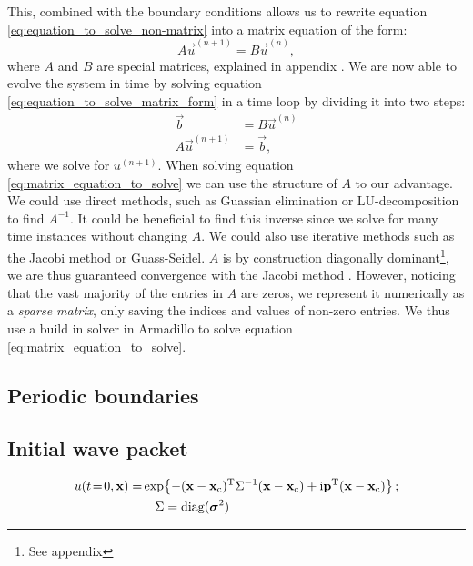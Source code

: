         This, combined with the boundary conditions allows us to rewrite equation \eqref{eq:equation_to_solve_non-matrix} into a matrix equation of the form:
        \begin{equation}\label{eq:equation_to_solve_matrix_form}
            A\vec{u}^{(n+1)} = B\vec{u}^{(n)},
        \end{equation}
        where $A$ and $B$ are special matrices, explained in appendix . 
        We are now able to evolve the system in time by solving equation \eqref{eq:equation_to_solve_matrix_form} in a time loop by dividing it into two steps:
        \begin{equation}\label{eq:matrix_equation_to_solve}
            \begin{split}
                \vec{b} &= B\vec{u}^{(n)} \\
                A\vec{u}^{(n+1)} &= \vec{b},
            \end{split}
        \end{equation}
        where we solve for $u^{(n+1)}$. When solving equation \eqref{eq:matrix_equation_to_solve} we can use the structure of $A$ to our advantage. We could use direct methods, such as Guassian elimination or LU-decomposition to find $A^{-1}$. It could be beneficial to find this inverse since we solve for many time instances without changing $A$. We could also use iterative methods such as the Jacobi method or Guass-Seidel. $A$ is by construction diagonally dominant\footnote{See appendix }, we are thus guaranteed convergence with the Jacobi method . However, noticing that the vast majority of the entries in $A$ are zeros, we represent it numerically as a \textit{sparse matrix}, only saving the indices and values of non-zero entries. We thus use a build in solver in Armadillo to solve equation \eqref{eq:matrix_equation_to_solve}.

\subsection{Periodic boundaries}\label{sec:method:periodic_boundaries}

\subsection{Initial wave packet}\label{sec:method:initial_wave}


    \begin{equation}\label{eq:p4_initial_condition}
    \begin{split}
        u(t\!=\!0, \mathbf{x}) = & \exp{-(\mathbf{x}-\mathbf{x}_\mathrm{c})^\mathrm{T}\Sigma^{-1}(\mathbf{x}-\mathbf{x}_\mathrm{c}) + \mathrm{i}\mathbf{p}^\mathrm{T}(\mathbf{x}-\mathbf{x}_\mathrm{c})} \,;  \\ 
        &\quad\Sigma = \mathrm{diag}(\boldsymbol{\sigma}^2)  
    \end{split}
    \end{equation}
 
